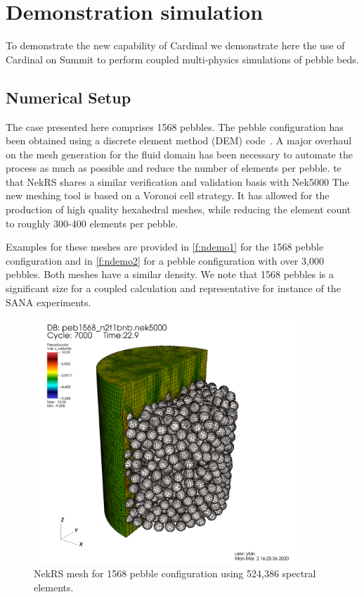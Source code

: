 \section{Demonstration simulation}
\label{s:demo}

To demonstrate the new capability of Cardinal we demonstrate here the use of
Cardinal on Summit to perform coupled multi-physics simulations of pebble beds.

\subsection{Numerical Setup}

The case presented here comprises 1568 pebbles. The pebble configuration has been obtained using a discrete element method (DEM) code~\cite{projectChronoWebSite}. 
A major overhaul on the mesh generation for the fluid domain has been necessary to automate the process as much as possible and reduce the number of elements per pebble.
te that NekRS shares a similar verification and validation basis with Nek5000
The new meshing tool is based on a Voronoi cell strategy. 
It has allowed for the production of high quality hexahedral meshes, while reducing the element count to roughly 300-400 elements per pebble.

Examples for these meshes are provided in \autoref{f:ndemo1} for the 1568 pebble configuration and in \autoref{f:ndemo2} for a pebble configuration with over 3,000 pebbles.
Both meshes have a similar density.
We note that 1568 pebbles is a significant size for a coupled calculation and representative for instance of the SANA experiments.

\begin{figure}[htb!]
\centering
\includegraphics[clip=true,width=0.9\textwidth]{Figures/ndemo_r1}
\caption{NekRS mesh for 1568 pebble configuration using 524,386 spectral elements.}
\label{f:ndemo1}
\end{figure}

